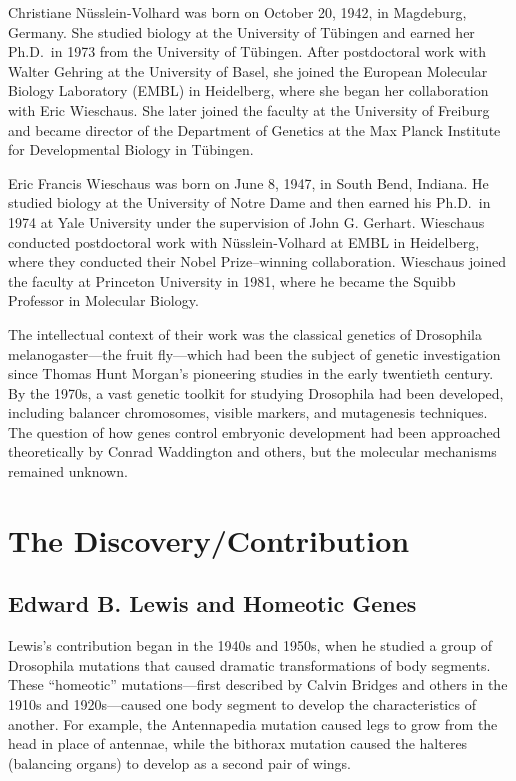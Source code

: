 Christiane N\"usslein-Volhard was born on October 20, 1942, in Magdeburg, Germany. She studied biology at the University of T{\"u}bingen and earned her Ph.D.\ in 1973 from the University of T{\"u}bingen. After postdoctoral work with Walter Gehring at the University of Basel, she joined the European Molecular Biology Laboratory (EMBL) in Heidelberg, where she began her collaboration with Eric Wieschaus. She later joined the faculty at the University of Freiburg and became director of the Department of Genetics at the Max Planck Institute for Developmental Biology in T{\"u}bingen.

Eric Francis Wieschaus was born on June 8, 1947, in South Bend, Indiana. He studied biology at the University of Notre Dame and then earned his Ph.D.\ in 1974 at Yale University under the supervision of John G. Gerhart. Wieschaus conducted postdoctoral work with N\"usslein-Volhard at EMBL in Heidelberg, where they conducted their Nobel Prize--winning collaboration. Wieschaus joined the faculty at Princeton University in 1981, where he became the Squibb Professor in Molecular Biology.

The intellectual context of their work was the classical genetics of Drosophila melanogaster---the fruit fly---which had been the subject of genetic investigation since Thomas Hunt Morgan's pioneering studies in the early twentieth century. By the 1970s, a vast genetic toolkit for studying Drosophila had been developed, including balancer chromosomes, visible markers, and mutagenesis techniques. The question of how genes control embryonic development had been approached theoretically by Conrad Waddington and others, but the molecular mechanisms remained unknown.

\section{The Discovery/Contribution}

\subsection{Edward B. Lewis and Homeotic Genes}

Lewis's contribution began in the 1940s and 1950s, when he studied a group of Drosophila mutations that caused dramatic transformations of body segments. These ``homeotic'' mutations---first described by Calvin Bridges and others in the 1910s and 1920s---caused one body segment to develop the characteristics of another. For example, the Antennapedia mutation caused legs to grow from the head in place of antennae, while the bithorax mutation caused the halteres (balancing organs) to develop as a second pair of wings.

